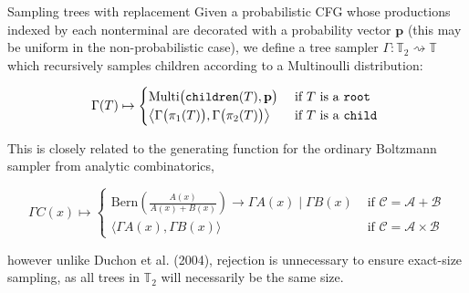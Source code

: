 \documentclass{beamer}
\begin{document}
\begin{frame}[fragile]{Sampling trees with replacement}
  Given a probabilistic CFG whose productions indexed by each nonterminal are decorated with a probability vector $\mathbf{p}$ (this may be uniform in the non-probabilistic case), we define a tree sampler $\Gamma: \mathbb{T}_2 \rightsquigarrow \mathbb{T}$ which recursively samples children according to a Multinoulli distribution:

  \begin{equation*}
    \Gamma(T) \mapsto \begin{cases}
      \text{Multi} \big(\texttt{children}(T), \mathbf{p}\big) & \text{ if $T$ is a \texttt{root}} \\
      \big\langle \Gamma\big(\pi_1(T)\big), \Gamma\big(\pi_2(T)\big) \big\rangle & \text{ if $T$ is a \texttt{child} }
    \end{cases}
  \end{equation*}

  This is closely related to the generating function for the ordinary Boltzmann sampler from analytic combinatorics,

  \begin{equation*}
    \Gamma C(x) \mapsto \begin{cases}
                          \text{Bern} \left(\frac{A(x)}{A(x) + B(x)}\right) \rightarrow \Gamma A(x) \mid \Gamma B(x) & \text{ if } \mathcal{C}=\mathcal{A}+\mathcal{B} \\
                          \big\langle \Gamma A(x), \Gamma B(x)\big\rangle & \text{ if } \mathcal{C}=\mathcal{A} \times \mathcal{B}
    \end{cases}
  \end{equation*}

  \noindent however unlike Duchon et al. (2004), rejection is unnecessary to ensure exact-size sampling, as all trees in $\mathbb{T}_2$ will necessarily be the same size.
\end{frame}
\end{document}
